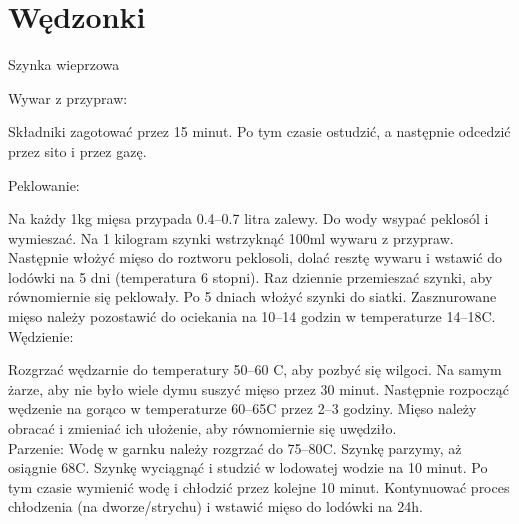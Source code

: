 \documentclass[a4paper,12pt]{article}
\begin{document}
\newpage%
\section{Wędzonki}

\begin{recipe}{Szynka wieprzowa}{}{}

\freeform%
Wywar z przypraw:

Składniki zagotować przez 15 minut. Po tym czasie ostudzić, a następnie odcedzić przez sito i przez gazę.

\freeform%
Peklowanie:


Na każdy 1kg mięsa przypada 0.4--0.7 litra zalewy.
Do wody wsypać peklosól i wymieszać. Na 1 kilogram szynki wstrzyknąć 100ml wywaru z przypraw.
\freeform%
Następnie włożyć mięso do roztworu peklosoli, dolać resztę wywaru i wstawić do lodówki na 5 dni (temperatura 6 stopni). 
Raz dziennie przemieszać szynki, aby równomiernie się peklowały.
Po 5 dniach włożyć szynki do siatki.
Zasznurowane mięso należy pozostawić do ociekania na 10--14 godzin w temperaturze 14--18\0C. \\

Wędzienie:

Rozgrzać wędzarnie do temperatury 50--60 \0C, aby pozbyć się wilgoci.
Na samym żarze, aby nie było wiele dymu suszyć mięso przez 30 minut.
Następnie rozpocząć wędzenie na gorąco w temperaturze 60--65\0C przez 2--3 godziny. Mięso należy obracać i zmieniać ich ułożenie, aby równomiernie się uwędziło. \\

Parzenie:
Wodę w garnku należy rozgrzać do 75--80\0C. Szynkę parzymy, aż osiągnie 68\0C. 
Szynkę wyciągnąć i studzić w lodowatej wodzie na 10 minut. Po tym czasie wymienić wodę i chłodzić przez kolejne 10 minut. Kontynuować proces chłodzenia (na dworze/strychu) i wstawić mięso do lodówki na 24h.
\end{recipe}

\newpage
\end{document}
